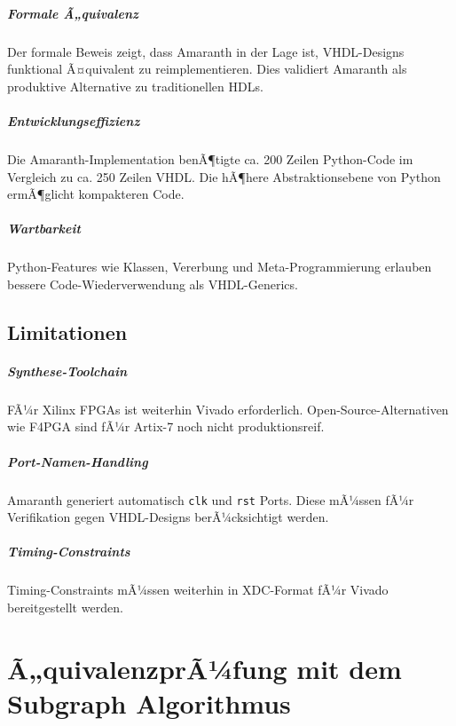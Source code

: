 ﻿\documentclass[12pt,a4paper]{report}
\begin{document}
\paragraph{Formale Ã„quivalenz}
Der formale Beweis zeigt, dass Amaranth in der Lage ist, VHDL-Designs funktional Ã¤quivalent zu reimplementieren. Dies validiert Amaranth als produktive Alternative zu traditionellen HDLs.

\paragraph{Entwicklungseffizienz}
Die Amaranth-Implementation benÃ¶tigte ca. 200 Zeilen Python-Code im Vergleich zu ca. 250 Zeilen VHDL. Die hÃ¶here Abstraktionsebene von Python ermÃ¶glicht kompakteren Code.

\paragraph{Wartbarkeit}
Python-Features wie Klassen, Vererbung und Meta-Programmierung erlauben bessere Code-Wiederverwendung als VHDL-Generics.

\section{Limitationen}

\paragraph{Synthese-Toolchain}
FÃ¼r Xilinx FPGAs ist weiterhin Vivado erforderlich. Open-Source-Alternativen wie F4PGA sind fÃ¼r Artix-7 noch nicht produktionsreif.

\paragraph{Port-Namen-Handling}
Amaranth generiert automatisch \texttt{clk} und \texttt{rst} Ports. Diese mÃ¼ssen fÃ¼r Verifikation gegen VHDL-Designs berÃ¼cksichtigt werden.

\paragraph{Timing-Constraints}
Timing-Constraints mÃ¼ssen weiterhin in XDC-Format fÃ¼r Vivado bereitgestellt werden.

\chapter{Ã„quivalenzprÃ¼fung mit dem Subgraph Algorithmus}
\label{sec:subgraph_equiv}
\end{document}
